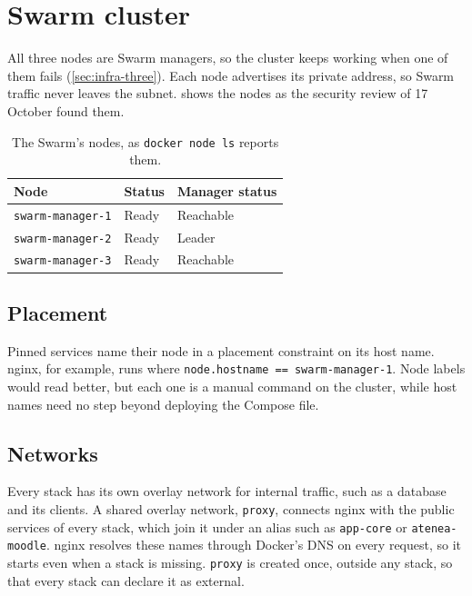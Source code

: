 \section{Swarm cluster}
\label{sec:swarm}

All three nodes are Swarm managers, so the cluster keeps working when one
of them fails (\cref{sec:infra-three}). Each node advertises its private
address, so Swarm traffic never leaves the subnet.  shows
the nodes as the security review of 17 October found them.

\begin{table}[htbp]
  \centering
  \caption{The Swarm's nodes, as \texttt{docker node ls} reports them.}
  \label{tab:nodes}
  \begin{tabular}{lll}
    \toprule
    Node                     & Status & Manager status \\
    \midrule
    \texttt{swarm-manager-1} & Ready  & Reachable \\
    \texttt{swarm-manager-2} & Ready  & Leader \\
    \texttt{swarm-manager-3} & Ready  & Reachable \\
    \bottomrule
  \end{tabular}
\end{table}

\subsection{Placement}

Pinned services name their node in a placement constraint on its host
name. nginx, for example, runs where
\texttt{node.hostname == swarm-manager-1}. Node labels would read
better, but each one is a manual command on the cluster, while host names
need no step beyond deploying the Compose file.

\subsection{Networks}

Every stack has its own overlay network for internal traffic, such as a
database and its clients. A shared overlay network, \texttt{proxy},
connects nginx with the public services of every stack, which join it
under an alias such as \texttt{app-core} or \texttt{atenea-moodle}. nginx
resolves these names through Docker's DNS on every request, so it starts
even when a stack is missing. \texttt{proxy} is created once, outside any
stack, so that every stack can declare it as external.

